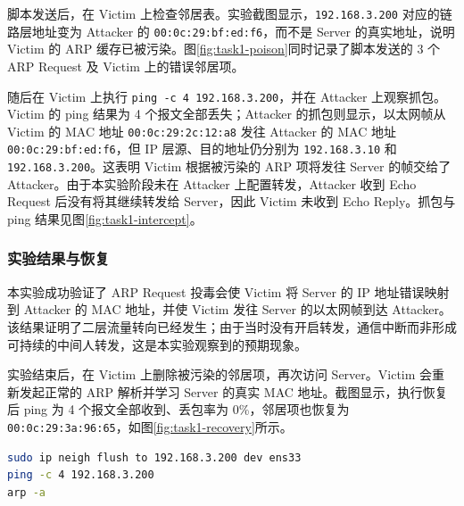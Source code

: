 
脚本发送后，在 Victim 上检查邻居表。实验截图显示，\texttt{192.168.3.200} 对应的链路层地址变为 Attacker 的 \texttt{00:0c:29:bf:ed:f6}，而不是 Server 的真实地址，说明 Victim 的 ARP 缓存已被污染。图\ref{fig:task1-poison}同时记录了脚本发送的 3 个 ARP Request 及 Victim 上的错误邻居项。


随后在 Victim 上执行 \texttt{ping -c 4 192.168.3.200}，并在 Attacker 上观察抓包。Victim 的 ping 结果为 4 个报文全部丢失；Attacker 的抓包则显示，以太网帧从 Victim 的 MAC 地址 \texttt{00:0c:29:2c:12:a8} 发往 Attacker 的 MAC 地址 \texttt{00:0c:29:bf:ed:f6}，但 IP 层源、目的地址仍分别为 \texttt{192.168.3.10} 和 \texttt{192.168.3.200}。这表明 Victim 根据被污染的 ARP 项将发往 Server 的帧交给了 Attacker。由于本实验阶段未在 Attacker 上配置转发，Attacker 收到 Echo Request 后没有将其继续转发给 Server，因此 Victim 未收到 Echo Reply。抓包与 ping 结果见图\ref{fig:task1-intercept}。


\begin{samepage}
\subsubsection{实验结果与恢复}

本实验成功验证了 ARP Request 投毒会使 Victim 将 Server 的 IP 地址错误映射到 Attacker 的 MAC 地址，并使 Victim 发往 Server 的以太网帧到达 Attacker。该结果证明了二层流量转向已经发生；由于当时没有开启转发，通信中断而非形成可持续的中间人转发，这是本实验观察到的预期现象。
\end{samepage}

实验结束后，在 Victim 上删除被污染的邻居项，再次访问 Server。Victim 会重新发起正常的 ARP 解析并学习 Server 的真实 MAC 地址。截图显示，执行恢复后 ping 为 4 个报文全部收到、丢包率为 0\%，邻居项也恢复为 \texttt{00:0c:29:3a:96:65}，如图\ref{fig:task1-recovery}所示。

\begin{lstlisting}[language=bash,caption={清除错误邻居项并验证恢复}]
sudo ip neigh flush to 192.168.3.200 dev ens33
ping -c 4 192.168.3.200
arp -a
\end{lstlisting}


